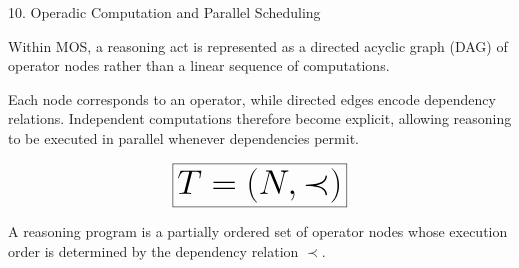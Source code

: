 %
%

\begin{mosbox}{10. Operadic Computation and Parallel Scheduling}

\BodyFont

Within MOS, a reasoning act is represented as a directed acyclic graph
(DAG) of operator nodes rather than a linear sequence of computations.

Each node corresponds to an operator, while directed edges encode
dependency relations. Independent computations therefore become explicit,
allowing reasoning to be executed in parallel whenever dependencies
permit.

\end{mosbox}


\begin{eqbox}

\[
\Huge
\boxed{
T=(N,\prec)
}
\]

\vspace{2mm}

\BodyFont

A reasoning program is a partially ordered set of operator nodes whose
execution order is determined by the dependency relation
$\prec$.

\end{eqbox}


\begin{center}


\end{center}

